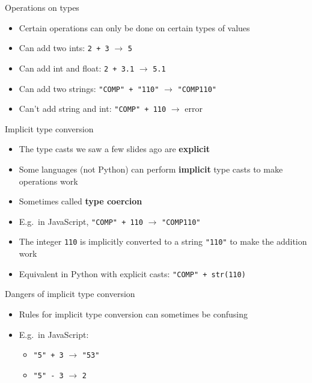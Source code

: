\begin{frame}{Operations on types}
	\begin{itemize}
		\pause\item Certain operations can only be done on certain types of values
		\pause\item Can add two ints: \lstinline{2 + 3} $\to$ \lstinline{5}
		\pause\item Can add int and float: \lstinline{2 + 3.1} $\to$ \lstinline{5.1}
		\pause\item Can add two strings: \lstinline{"COMP" + "110"} $\to$ \lstinline{"COMP110"}
		\pause\item Can't add string and int: \lstinline{"COMP" + 110} $\to$ error
	\end{itemize}
\end{frame}

\begin{frame}{Implicit type conversion}
	\begin{itemize}
		\pause\item The type casts we saw a few slides ago are \textbf{explicit}
		\pause\item Some languages (not Python) can perform \textbf{implicit} type casts to make operations work
		\pause\item Sometimes called \textbf{type coercion}
		\pause\item E.g.\ in JavaScript, \lstinline{"COMP" + 110} $\to$ \lstinline{"COMP110"}
		\pause\item The integer \lstinline{110} is implicitly converted to a string \lstinline{"110"} to make the addition work
		\pause\item Equivalent in Python with explicit casts: \lstinline{"COMP" + str(110)}
	\end{itemize}
\end{frame}

\begin{frame}{Dangers of implicit type conversion}
	\begin{itemize}
		\pause\item Rules for implicit type conversion can sometimes be confusing
		\pause\item E.g.\ in JavaScript:
			\begin{itemize}
				\pause\item \lstinline{"5" + 3} $\to$ \lstinline{"53"}
				\pause\item \lstinline{"5" - 3} $\to$ \lstinline{2}
			\end{itemize}
	\end{itemize}
\end{frame}

